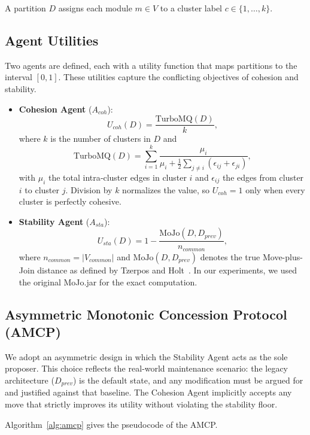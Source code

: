 \documentclass[conference]{IEEEtran}
\begin{document}
A partition $D$ assigns each module $m\in V$ to a cluster label $c\in\{1,\dots,k\}$.

\subsection{Agent Utilities}
Two agents are defined, each with a utility function that maps partitions to the interval $[0,1]$. These utilities capture the conflicting objectives of cohesion and stability.

\begin{itemize}
\item \textbf{Cohesion Agent} ($A_{coh}$):
  \begin{equation}
  U_{coh}(D) = \frac{\mathrm{TurboMQ}(D)}{k},
  \label{eq:ucoh}
  \end{equation}
  where $k$ is the number of clusters in $D$ and
  \[
  \mathrm{TurboMQ}(D) = \sum_{i=1}^{k} \frac{\mu_i}{\mu_i + \tfrac12\sum_{j\neq i}(\epsilon_{ij}+\epsilon_{ji})},
  \]
  with $\mu_i$ the total intra‑cluster edges in cluster $i$ and $\epsilon_{ij}$ the edges from cluster $i$ to cluster $j$. Division by $k$ normalizes the value, so $U_{coh}=1$ only when every cluster is perfectly cohesive.

\item \textbf{Stability Agent} ($A_{sta}$):
  \begin{equation}
  U_{sta}(D) = 1 - \frac{\mathrm{MoJo}(D, D_{prev})}{n_{common}},
  \label{eq:usta}
  \end{equation}
  where $n_{common}=|V_{common}|$ and $\mathrm{MoJo}(D, D_{prev})$ denotes the true Move-plus-Join distance as defined by Tzerpos and Holt~\cite{Tzerpos1999}. In our experiments, we used the original MoJo.jar for the exact computation.
\end{itemize}

\subsection{Asymmetric Monotonic Concession Protocol (AMCP)}
We adopt an asymmetric design in which the Stability Agent acts as the sole proposer. This choice reflects the real‑world maintenance scenario: the legacy architecture ($D_{prev}$) is the default state, and any modification must be argued for and justified against that baseline. The Cohesion Agent implicitly accepts any move that strictly improves its utility without violating the stability floor.

Algorithm~\ref{alg:amcp} gives the pseudocode of the AMCP.
\end{document}

